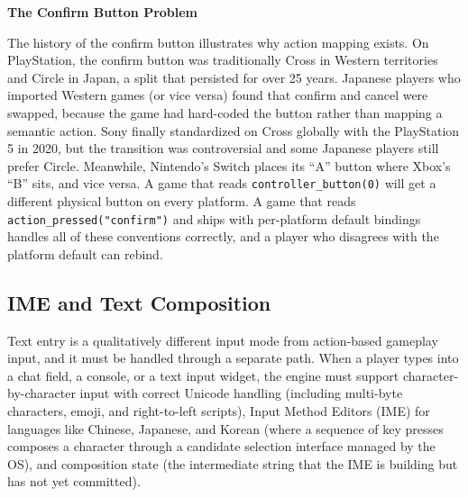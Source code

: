 \documentclass[
  11pt,
  letterpaper,
  DIV=11,
  numbers=noendperiod,
  twoside,
  open=right]{scrreprt}
\begin{document}
\begin{tcolorbox}[enhanced jigsaw, arc=.35mm, bottomrule=.15mm, breakable, colback=white, colframe=quarto-callout-tip-color-frame, left=2mm, leftrule=.75mm, opacityback=0, rightrule=.15mm, toprule=.15mm]
\begin{minipage}[t]{5.5mm}
\textcolor{quarto-callout-tip-color}{\faLightbulb}
\end{minipage}%
\begin{minipage}[t]{\textwidth - 5.5mm}

\vspace{-3mm}\textbf{The Confirm Button Problem}\vspace{3mm}

The history of the confirm button illustrates why action mapping exists.
On PlayStation, the confirm button was traditionally Cross in Western
territories and Circle in Japan, a split that persisted for over 25
years. Japanese players who imported Western games (or vice versa) found
that confirm and cancel were swapped, because the game had hard-coded
the button rather than mapping a semantic action. Sony finally
standardized on Cross globally with the PlayStation 5 in 2020, but the
transition was controversial and some Japanese players still prefer
Circle. Meanwhile, Nintendo's Switch places its ``A'' button where
Xbox's ``B'' sits, and vice versa. A game that reads
\texttt{controller\_button(0)} will get a different physical button on
every platform. A game that reads \texttt{action\_pressed("confirm")}
and ships with per-platform default bindings handles all of these
conventions correctly, and a player who disagrees with the platform
default can rebind.

\end{minipage}%
\end{tcolorbox}

\subsection{IME and Text Composition}\label{ime-and-text-composition}

Text entry is a qualitatively different input mode from action-based
gameplay input, and it must be handled through a separate path. When a
player types into a chat field, a console, or a text input widget, the
engine must support character-by-character input with correct Unicode
handling (including multi-byte characters, emoji, and right-to-left
scripts), Input Method Editors (IME) for languages like Chinese,
Japanese, and Korean (where a sequence of key presses composes a
character through a candidate selection interface managed by the OS),
and composition state (the intermediate string that the IME is building
but has not yet committed).
\end{document}
